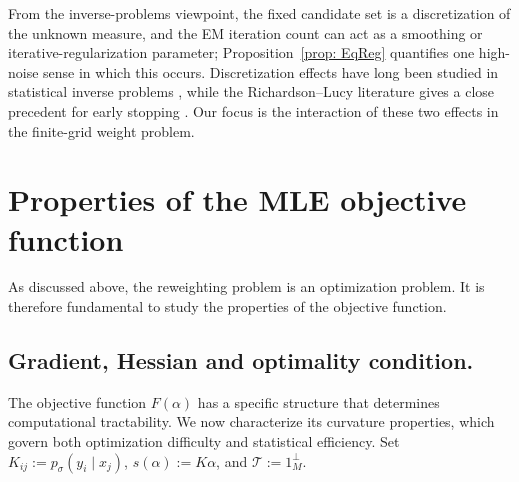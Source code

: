 \documentclass[12pt]{iopart}
\theoremstyle{remark}
\begin{document}
From the inverse-problems viewpoint, the fixed candidate set is a
discretization of the unknown measure, and the EM iteration count can act as a
smoothing or iterative-regularization parameter; Proposition~\ref{prop: EqReg}
quantifies one high-noise sense in which this occurs. Discretization effects have long been
studied in statistical inverse problems \citep{johnstone1991discretization},
while the Richardson--Lucy literature gives a close precedent for early
stopping \citep{bertero2009image}. Our focus is the interaction of these two
effects in the finite-grid weight problem.





\section{Properties of the MLE objective function}
\label{sec: Obj}

As discussed above, the reweighting problem is an optimization problem. It is therefore fundamental to study the properties of the objective function. 

\subsection{Gradient, Hessian and optimality condition.}
\label{sec: GradHess}
The objective function $F(\alpha)$ has a specific structure that determines 
computational tractability. We now characterize its curvature properties, 
which govern both optimization difficulty and statistical efficiency. Set $K_{ij}:=p_\sigma(y_i\mid x_j)$,
$s(\alpha):=K\alpha$, and $\mathcal T:=1_M^\perp$.
\end{document}
